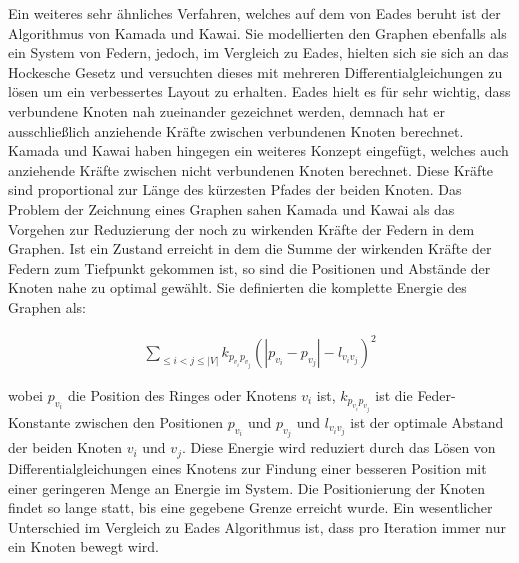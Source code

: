 Ein weiteres sehr ähnliches Verfahren, welches auf dem von Eades beruht ist der Algorithmus von Kamada und Kawai. Sie modellierten den Graphen ebenfalls als ein System von Federn, jedoch, im Vergleich zu Eades, hielten sich sie sich an das Hockesche Gesetz und versuchten dieses mit mehreren Differentialgleichungen zu lösen um ein verbessertes Layout zu erhalten. Eades hielt es für sehr wichtig, dass verbundene Knoten nah zueinander gezeichnet werden, demnach hat er ausschließlich anziehende Kräfte zwischen verbundenen Knoten berechnet. Kamada und Kawai haben hingegen ein weiteres Konzept eingefügt, welches auch anziehende Kräfte zwischen nicht verbundenen Knoten berechnet. Diese Kräfte sind proportional zur Länge des kürzesten Pfades der beiden Knoten. Das Problem der Zeichnung eines Graphen sahen Kamada und Kawai als das Vorgehen zur Reduzierung der noch zu wirkenden Kräfte der Federn in dem Graphen. Ist ein Zustand erreicht in dem die Summe der wirkenden Kräfte der Federn zum Tiefpunkt gekommen ist, so sind die Positionen und Abstände der Knoten nahe zu optimal gewählt. Sie definierten die komplette Energie des Graphen als: 

\begin{align}
	\sum_{\leq i < j\leq |V|}k_{p_{v_{i}}p_{v_{j}}}(|p_{v_{i}}-p_{v_{j}}|-l_{v_{i}v_{j}})^{2}
\end{align}

wobei $p_{v_{i}}$ die Position des Ringes oder Knotens $v_{i}$ ist, $k_{p_{v_{i}}p_{v_{j}}}$ ist die Feder-Konstante zwischen den Positionen $p_{v_{i}}$ und $p_{v_{j}}$ und $l_{v_{i}v_{j}}$ ist der optimale Abstand der beiden Knoten $v_{i}$ und $v_{j}$. Diese Energie wird reduziert durch das Lösen von Differentialgleichungen eines Knotens zur Findung einer besseren Position mit einer geringeren Menge an Energie im System. Die Positionierung der Knoten findet so lange statt, bis eine gegebene Grenze erreicht wurde. Ein wesentlicher Unterschied im Vergleich zu Eades Algorithmus ist, dass pro Iteration immer nur ein Knoten bewegt wird. \\





